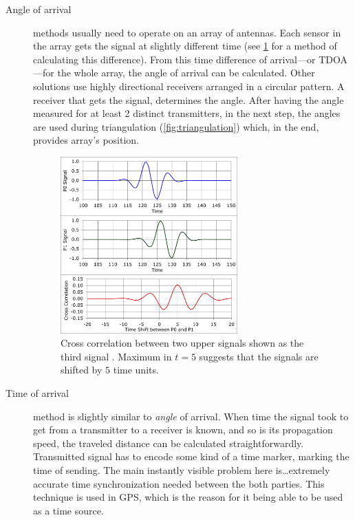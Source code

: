 \begin{description}
	\item[Angle of arrival] methods usually need to operate on an array of antennas. Each sensor in the array gets the signal at slightly different time (see \cref{fig:cross-corr-pulse} for a method of calculating this difference). From this time difference of arrival---or TDOA---for the whole array, the angle of arrival can be calculated. Other solutions use highly directional receivers arranged in a circular pattern. A receiver that gets the signal, determines the angle. After having the angle measured for at least 2 distinct transmitters, in the next step, the angles are used during triangulation (\cref{fig:triangulation}) which, in the end, provides array's position.
	
	\begin{figure}[h]
		\centering
		\includegraphics[width=0.67\textwidth]{cross-corr-pulse}
		\caption{Cross correlation between two upper signals shown as the third signal \cite{wiki:cross-corr-pulse}. Maximum in $t=5$ suggests that the signals are shifted by $5$ time units.}
		\label{fig:cross-corr-pulse}
	\end{figure}
	
	\item[Time of arrival] method is slightly similar to \emph{angle} of arrival. When time the signal took to get from a transmitter to a receiver is known, and so is its propagation speed, the traveled distance can be calculated straightforwardly. Transmitted signal has to encode some kind of a time marker, marking the time of sending. The main instantly visible problem here is\ldots extremely accurate time synchronization needed between the both parties. This technique is used in GPS, which is the reason for it being able to be used as a time source.
	

\end{description}
